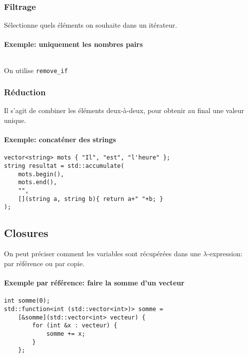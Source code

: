 \documentclass[10pt,a4paper,french]{article}
\begin{document}
\subsubsection{Filtrage}

Sélectionne quels éléments on souhaite dans un itérateur.

\paragraph{Exemple: uniquement les nombres pairs}
\begin{verbatim}

\end{verbatim}

On utilise \texttt{remove_if}

\subsubsection{Réduction}

Il s'agit de combiner les éléments deux-à-deux, pour obtenir au final une valeur unique.

\paragraph{Exemple: concaténer des strings}
\begin{verbatim}
vector<string> mots { "Il", "est", "l'heure" };
string resultat = std::accumulate(
    mots.begin(),
    mots.end(),
    "",
    [](string a, string b){ return a+" "+b; }
);
\end{verbatim}

\subsection{Closures}

On peut préciser comment les variables sont récupérées dans une $\lambda$-expression: par référence ou par copie.

\paragraph{Exemple par référence: faire la somme d'un vecteur}
\begin{verbatim}
int somme(0);
std::function<int (std::vector<int>)> somme =
    [&somme](std::vector<int> vecteur) {
        for (int &x : vecteur) {
            somme += x;
        }
    };
\end{verbatim}
\end{document}
